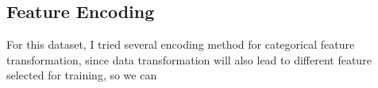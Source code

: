 \documentclass[a4paper, oneside, final, 12pt]{scrartcl} %
\begin{document}
\subsection{Feature Encoding}

For this dataset, I tried several encoding method for categorical feature transformation,
since data transformation will also lead to different feature selected for training,
so we can 



\endgroup

\end{document}
